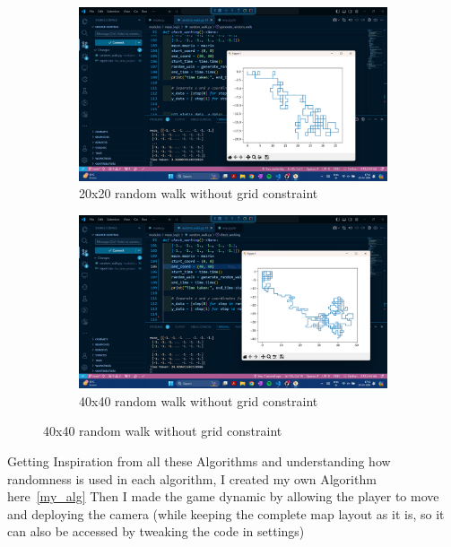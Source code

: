 \documentclass{article}
\begin{document}
\begin{figure}[h]
    \caption[1]{}
    \begin{subfigure}[b]{0.5\textwidth}
        \centering
        \includegraphics[width=\textwidth]{screenshots/Screenshot (164).png}
        \caption[(a)]{20x20 random walk without grid constraint}
        \label{fig:20x20random_walk}
    \end{subfigure}
    \begin{subfigure}[b]{0.5\textwidth}
        \centering
        \includegraphics[width=\textwidth]{screenshots/Screenshot (166).png}
        \caption[(a)]{40x40 random walk without grid constraint}
        \label{fig:40x40random_walk}
    \end{subfigure}
\end{figure}

\noindent Getting Inspiration from all these Algorithms and understanding how randomness is used in each algorithm, I created my own Algorithm here~\ref{my_alg}
Then I made the game dynamic by allowing the player to move and deploying the camera (while keeping the complete map layout as it is, so it can also be accessed by tweaking the code in settings)
\end{document}
